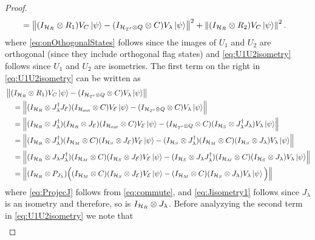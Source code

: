 \documentclass[10pt]{article}
\newcommand{\SOUT}{\mathrm{out}}
\newcommand{\norm}[1]{\left\|#1\right\|}
\begin{document}
\begin{proof}
\begin{align}
            &=\norm{(I_{\calH_R}\otimes R_1)V_{C}\ket{\psi}-(I_{\calH_{T'}\otimes Q}\otimes C) V_{\lambda}\ket{\psi}}^2+\norm{(I_{\calH_R}\otimes R_2)V_C\ket{\psi}}^2\label{eq:U1U2isometry}.
        \end{align}
        where \eqref{eq:onOthogonalStates} follows since the images of $U_1$ and $U_2$ are orthogonal (since they
        include orthogonal flag states) and \eqref{eq:U1U2isometry} follows since $U_1$ and $U_2$ are isometries. The first term on the right in \eqref{eq:U1U2isometry} can be written as
        \begin{align}
            &\nonumber\norm{(I_{\calH_R}\otimes R_1)V_{C}\ket{\psi}-(I_{\calH_{T'}\otimes Q}\otimes C) V_{\lambda}\ket{\psi}}\\
            &\nonumber\quad =\norm{(I_{\calH_R}\otimes J_{\lambda}^\dag J_{\calE})(I_{\calH_{\SOUT}}\otimes C)V_{\calE}\ket{\psi}-(I_{\calH_{T'}\otimes Q}\otimes C) V_{\lambda}\ket{\psi}}\nonumber\\&
            \quad =\norm{(I_{\calH_R}\otimes J_{\lambda}^\dag )(I_{\calH_R}\otimes  J_{\calE})(I_{\calH_{\SOUT}}\otimes C)V_{\calE}\ket{\psi}-(I_{\calH_{T'}\otimes Q}\otimes C) (I_{\calH_{S}}\otimes J_{\lambda}^\dag J_{\lambda})V_{\lambda}\ket{\psi}}\label{eq:ProjecJ}\\&
            \quad =\norm{(I_{\calH_R}\otimes J_{\lambda}^\dag )(I_{\calH_{M}}\otimes C)(I_{\calH_S}\otimes  J_{\calE})V_{\calE}\ket{\psi}  -(I_{\calH_{S}}\otimes J_{\lambda}^\dag )(I_{\calH_{M}}\otimes C) (I_{\calH_{S}}\otimes J_{\lambda})V_{\lambda}\ket{\psi}}\nonumber\\
            &\quad =\norm{(I_{\calH_R}\otimes J_{\lambda} J_{\lambda}^\dag )(I_{\calH_{M}}\otimes C)(I_{\calH_S}\otimes  J_{\calE})V_{\calE}\ket{\psi}  -(I_{\calH_{S}}\otimes J_{\lambda} J_{\lambda}^\dag )(I_{\calH_{M}}\otimes C) (I_{\calH_{S}}\otimes J_{\lambda})V_{\lambda}\ket{\psi}}\label{eq:Jisometry1}\\
            &\quad =\norm{(I_{\calH_R}\otimes P_{J_{\lambda}})\Big((I_{\calH_{M}}\otimes C)(I_{\calH_S}\otimes  J_{\calE})V_{\calE}\ket{\psi}  -(I_{\calH_{M}}\otimes C) (I_{\calH_{S}}\otimes J_{\lambda})V_{\lambda}\ket{\psi}\Big)}\label{eq:Jisometry2}            
        \end{align}
        where \eqref{eq:ProjecJ} follows from \eqref{eq:commute}, and \eqref{eq:Jisometry1} follows since $J_{\lambda}$ is an isometry and therefore, so is $I_{{\cal H}_R}\otimes J_{\lambda}$. Before analyzying the second term in \eqref{eq:U1U2isometry} we note that 
        \begin{align}

\end{align}
\end{proof}
\end{document}
